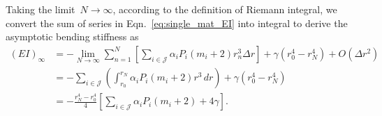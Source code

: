 \documentclass[preprint,10pt,times]{elsarticle}
\numberwithin{equation}{section}
\renewcommand{\>}{$\Rightarrow$}
\begin{document}
Taking the limit~$N \to \infty$, according to the definition of Riemann integral, we convert the sum of series in Eqn.~\eqref{eq:single_mat_EI} into integral to derive the asymptotic bending stiffness as
\begin{equation}
	\begin{aligned}
	(EI)_{\infty} & = - \lim\limits_{N \to \infty} \sum_{n=1}^{N} \left[ \sum_{i \in \mathcal{J}} \alpha_i P_i (m_i + 2 ) r_n^{3} \Delta r \right] + \gamma (r_0^4 - r_N^4) + O(\Delta r^2) \\
	 & = - \sum_{i \in \mathcal{J}} \left( \int_{r_0}^{r_N} \alpha_i P_i (m_i + 2 ) r^3 \, dr \right) + \gamma (r_0^4 - r_N^4) \\
	 & = - \frac{r_N^4 - r_0^4}{4} \left[ \sum_{i \in \mathcal{J}} \alpha_i P_i (m_i + 2 ) + 4\gamma\right].
	\end{aligned}
	\label{eq:single_mat_EI_final}
\end{equation}



\end{document}

